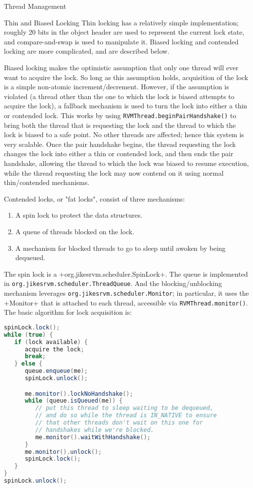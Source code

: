 \begin{section}{Thread Management}
\begin{subsection}{Thin and Biased Locking}
Thin locking has a relatively simple implementation; roughly 20 bits in the object header are used to represent the current lock state, and compare-and-swap is used to manipulate it. Biased locking and contended locking are more complicated, and are described below.

Biased locking makes the optimistic assumption that only one thread will ever want to acquire the lock. So long as this assumption holds, acquisition of the lock is a simple non-atomic increment/decrement. However, if the assumption is violated (a thread other than the one to which the lock is biased attempts to acquire the lock), a fallback mechanism is used to turn the lock into either a thin or contended lock. This works by using \texttt{RVM\-Thread.be\-gin\-Pair\-Hand\-sha\-ke()} to bring both the thread that is requesting the lock and the thread to which the lock is biased to a safe point. No other threads are affected; hence this system is very scalable. Once the pair handshake begins, the thread requesting the lock changes the lock into either a thin or contended lock, and then ends the pair handshake, allowing the thread to which the lock was biased to resume execution, while the thread requesting the lock may now contend on it using normal thin/contended mechanisms.

Contended locks, or "fat locks", consist of three mechanisms:
\begin{enumerate}
  \item A spin lock to protect the data structures.
  \item  A queue of threads blocked on the lock.
  \item  A mechanism for blocked threads to go to sleep until awoken by being dequeued.
\end{enumerate}

The spin lock is a \spverb+org.jikesrvm.scheduler.SpinLock+. The queue is implemented in \texttt{org.jikes\-rvm.sche\-du\-ler.Thread\-Queue}. And the blocking/unblocking mechanism leverages \texttt{org.jikes\-rvm.sche\-du\-ler.Mo\-ni\-tor}; in particular, it uses the \spverb+Monitor+ that is attached to each thread, accessible via \texttt{RVM\-Thread.mo\-ni\-tor()}. The basic algorithm for lock acquisition is:
\begin{lstlisting}[language=Java]
spinLock.lock();
while (true) {
   if (lock available) {
      acquire the lock;
      break;
   } else {
      queue.enqueue(me);
      spinLock.unlock();

      me.monitor().lockNoHandshake();
      while (queue.isQueued(me)) {
         // put this thread to sleep waiting to be dequeued, 
         // and do so while the thread is IN_NATIVE to ensure 
         // that other threads don't wait on this one for
         // handshakes while we're blocked.
         me.monitor().waitWithHandshake();
      }
      me.monitor().unlock();
      spinLock.lock();
   }
}
spinLock.unlock();
\end{lstlisting}


\end{subsection}
\end{section}
